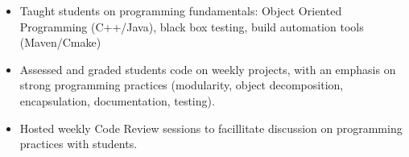 \begin{itemize}
  \item Taught students on programming fundamentals: Object Oriented Programming (C++/Java), black box testing, build automation tools (Maven/Cmake)
  \item Assessed and graded students code on weekly projects, with an emphasis on strong programming practices (modularity, object decomposition, encapsulation, documentation, testing).
  \item Hosted weekly Code Review sessions to facillitate discussion on programming practices with students.
\end{itemize}